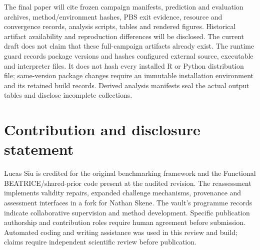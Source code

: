 \documentclass[
  british,
  10pt,
]{article}
\begin{document}
The final paper will cite frozen campaign manifests, prediction and
evaluation archives, method/environment hashes, PBS exit evidence,
resource and convergence records, analysis scripts, tables and rendered
figures. Historical artifact availability and reproduction differences
will be disclosed. The current draft does not claim that these
full-campaign artifacts already exist. The runtime guard records package
versions and hashes configured external source, executable and
interpreter files. It does not hash every installed R or Python
distribution file; same-version package changes require an immutable
installation environment and its retained build records. Derived
analysis manifests seal the actual output tables and disclose incomplete
collections.

\section{Contribution and disclosure
statement}\label{contribution-and-disclosure-statement}

Lucas Siu is credited for the original benchmarking framework and the
Functional BEATRICE/shared-prior code present at the audited revision.
The reassessment implements validity repairs, expanded challenge
mechanisms, provenance and assessment interfaces in a fork for Nathan
Skene. The vault's programme records indicate collaborative supervision
and method development. Specific publication authorship and contribution
roles require human agreement before submission. Automated coding and
writing assistance was used in this review and build; claims require
independent scientific review before publication.
\end{document}
